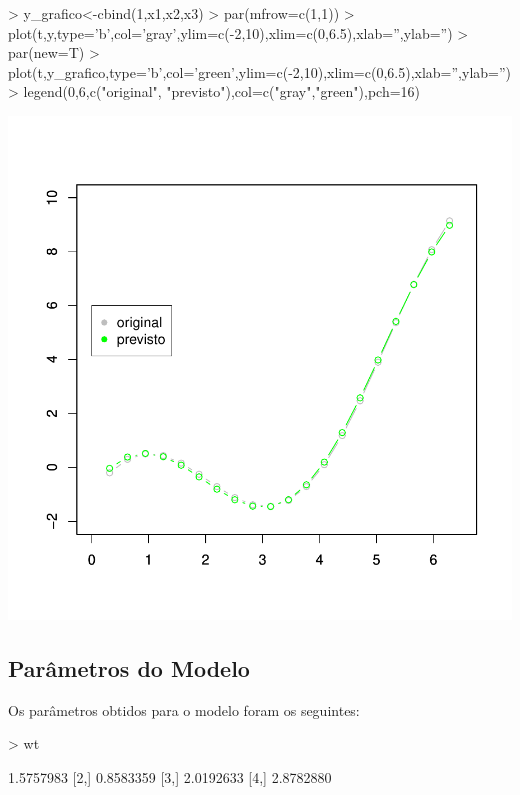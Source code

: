 \documentclass{article}
\begin{document}
\begin{Schunk}
\begin{Sinput}
>   y_grafico<-cbind(1,x1,x2,x3) %
>   par(mfrow=c(1,1))
>   plot(t,y,type='b',col='gray',ylim=c(-2,10),xlim=c(0,6.5),xlab='',ylab='')
>   par(new=T)
>   plot(t,y_grafico,type='b',col='green',ylim=c(-2,10),xlim=c(0,6.5),xlab='',ylab='')
>   legend(0,6,c("original", "previsto"),col=c("gray","green"),pch=16)
\end{Sinput}
\end{Schunk}
\includegraphics{adaline-009}

\subsection{Parâmetros do Modelo}

Os parâmetros obtidos para o modelo foram os seguintes:

\begin{Schunk}
\begin{Sinput}
>   wt
\end{Sinput}
\begin{Soutput}
          [,1]
[1,] 1.5757983
[2,] 0.8583359
[3,] 2.0192633
[4,] 2.8782880
\end{Soutput}
\end{Schunk}
\end{document}
